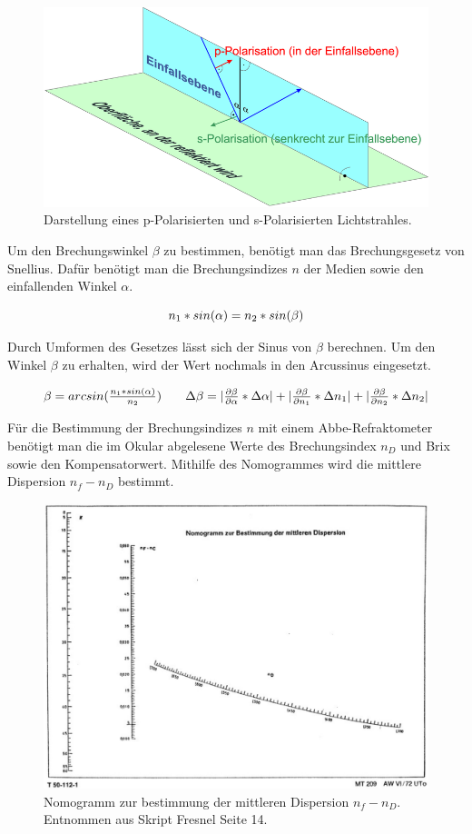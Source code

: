 \documentclass[12pt,a4paper,twoside]{article}
\begin{document}
\begin{figure}[H]
    \centering
    \includegraphics[width=0.6\linewidth]{nudes/sp pol.png}
    \caption{Darstellung eines p-Polarisierten und s-Polarisierten Lichtstrahles. \cite{Polarisation}}
    \label{fig:s-p-Polarisiert}
\end{figure}

\noindent
Um den Brechungswinkel $\beta$ zu bestimmen, benötigt man das Brechungsgesetz von Snellius. Dafür benötigt man die Brechungsindizes $n$ der Medien sowie den einfallenden Winkel $\alpha$. 

\begin{equation}
    \label{eq:Snellius}
    \centerline{$n_1 * sin(\alpha) = n_2 * sin(\beta)$}
\end{equation}

\noindent
Durch Umformen des Gesetzes lässt sich der Sinus von $\beta$ berechnen. Um den Winkel $\beta$ zu erhalten, wird der Wert nochmals in den Arcussinus eingesetzt. 

\begin{equation}
    \label{eq:Brechender Winkel}
    \centerline{$\beta = arcsin(\frac{n_1 * sin(\alpha)}{n_2})$ \\ $\Delta \beta = \vert \frac{\partial \beta}{\partial \alpha} * \Delta \alpha \vert + \vert \frac{\partial \beta}{\partial n_1} * \Delta n_1 \vert + \vert \frac{\partial \beta}{\partial n_2} * \Delta n_2 \vert$}
\end{equation}

\noindent
Für die Bestimmung der Brechungsindizes $n$ mit einem Abbe-Refraktometer benötigt man die im Okular abgelesene Werte des Brechungsindex $n_D$ und Brix sowie den Kompensatorwert. 
Mithilfe des Nomogrammes wird die mittlere Dispersion $n_f-n_D$ bestimmt. 

\begin{figure}[H]
    \centering
    \includegraphics[width=0.6\linewidth]{nudes/nomogramm.jpg}
    \caption{Nomogramm zur bestimmung der mittleren Dispersion $n_f-n_D$. Entnommen aus Skript Fresnel Seite 14. \cite{teachcenter2}}
    \label{fig:nomogramm}
\end{figure}
\end{document}
